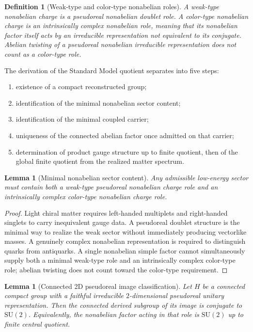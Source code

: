 \documentclass[11pt]{article}
\newtheorem{lemma}[theorem]{Lemma}
\newtheorem{definition}[theorem]{Definition}
\newcommand{\SU}{\mathrm{SU}}
\begin{document}
\begin{definition}[Weak-type and color-type nonabelian roles]
A weak-type nonabelian charge is a pseudoreal nonabelian doublet role. A color-type nonabelian charge is an intrinsically complex nonabelian role, meaning that its nonabelian factor itself acts by an irreducible representation not equivalent to its conjugate. Abelian twisting of a pseudoreal nonabelian irreducible representation does not count as a color-type role.
\end{definition}

The derivation of the Standard Model quotient separates into five steps:
\begin{enumerate}[leftmargin=2em]
\item existence of a compact reconstructed group;
\item identification of the minimal nonabelian sector content;
\item identification of the minimal coupled carrier;
\item uniqueness of the connected abelian factor once admitted on that carrier;
\item determination of product gauge structure up to finite quotient, then of the global finite quotient from the realized matter spectrum.
\end{enumerate}

\begin{lemma}[Minimal nonabelian sector content]\label{lem:mincontent}
Any admissible low-energy sector must contain both a weak-type pseudoreal nonabelian charge role and an intrinsically complex color-type nonabelian charge role.
\end{lemma}

\begin{proof}
Light chiral matter requires left-handed multiplets and right-handed singlets to carry inequivalent gauge data. A pseudoreal doublet structure is the minimal way to realize the weak sector without immediately producing vectorlike masses. A genuinely complex nonabelian representation is required to distinguish quarks from antiquarks. A single nonabelian simple factor cannot simultaneously supply both a minimal weak-type role and an intrinsically complex color-type role; abelian twisting does not count toward the color-type requirement.
\end{proof}

\begin{lemma}[Connected 2D pseudoreal image classification]\label{lem:su2class}
Let $H$ be a connected compact group with a faithful irreducible $2$-dimensional pseudoreal unitary representation. Then the connected derived subgroup of its image is conjugate to $\SU(2)$. Equivalently, the nonabelian factor acting in that role is $\SU(2)$ up to finite central quotient.
\end{lemma}
\end{document}
